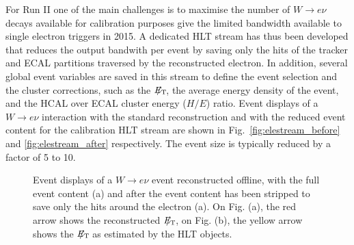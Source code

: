 \documentclass[journal]{IEEEtran}
\newcommand{\ETslash}{\ensuremath{E_{\mathrm{T}}\hspace{-1.1em}/\kern0.45em}}
\begin{document}
For Run II one of the main challenges is to maximise the number of $W\to e\nu$ decays available for calibration purposes give the limited bandwidth available to single electron triggers in 2015. A dedicated HLT stream has thus been developed that reduces the output bandwith per event by saving only the hits of the tracker and ECAL partitions traversed by the reconstructed electron. In addition, several global event variables are saved in this stream to define the event selection and the cluster corrections, such as the $\ETslash$, the average energy density of the event, and the HCAL over ECAL cluster energy ($H/E$) ratio. 
Event displays of a $W\to e \nu$ interaction with the standard reconstruction and with the reduced event content for the calibration HLT stream are shown in Fig.~\ref{fig:elestream_before} and \ref{fig:elestream_after} respectively. The event size is typically reduced by a factor of 5 to 10.
%
\begin{figure}[!t]
  \begin{center}
    \caption{Event displays of a $W\to e\nu$ event reconstructed offline, with the full event content (a) and after the event content has been stripped to save only the hits around the electron (a). On Fig. (a), the red arrow shows the reconstructed $\ETslash$, on Fig. (b), the yellow arrow shows the $\ETslash$ as estimated by the HLT objects. \label{fig:elestream}}
  \end{center}
\end{figure}
%
\end{document}
